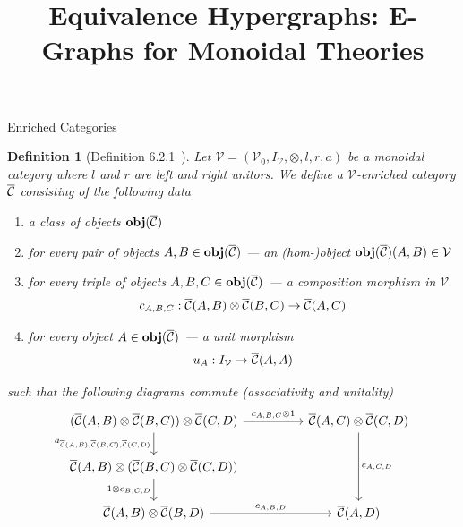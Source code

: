\documentclass[acmsmall, screen, nonacm]{acmart}
\newtheorem{definition}[theorem]{Definition}
\begin{document}
\title{Equivalence Hypergraphs: E-Graphs for Monoidal Theories}

\maketitle



\begin{section}{Enriched Categories}

\begin{definition}[Definition 6.2.1~\cite{Borceux_1994}]
  Let $\mathcal{V} = (\mathcal{V}_{0}, I_{\mathcal{V}}, \otimes, l, r, a)$ be a monoidal category where $l$ and $r$ are left and right unitors.
  We define a $\mathcal{V}$-enriched category ${\overline{\mathcal{C}}}$ consisting of the following data
  \begin{enumerate}
    \item a class of objects ${\mathbf{obj}({\overline{\mathcal{C}}})}$
    \item for every pair of objects $A,B \in {\mathbf{obj}({\overline{\mathcal{C}}})}$ --- an (hom-)object ${\mathbf{obj}({\overline{\mathcal{C}}})}(A,B) \in \mathcal{V}$
    \item for every triple of objects $A,B,C \in {\mathbf{obj}({\overline{\mathcal{C}}})}$ --- a composition morphism in $\mathcal{V}$
    \[
    c_{A,B,C} : {\overline{\mathcal{C}}}(A,B) \otimes {\overline{\mathcal{C}}}(B,C) \to {\overline{\mathcal{C}}}(A,C)
    \]
    \item for every object $A \in {\mathbf{obj}({\overline{\mathcal{C}}})}$ --- a unit morphism
    \[
      u_{A} : I_{\mathcal{V}} \to {\overline{\mathcal{C}}}(A,A)
    \]
  \end{enumerate}
  such that the following diagrams commute (associativity and unitality)
  \[
  \begin{tikzcd}
    {(\enriched{C}(A,B) \otimes \enriched{C}(B,C)) \otimes \enriched{C}(C,D)} \arrow[rr, "{c_{A,B,C} \otimes 1}"] \arrow[d, "{a_{\enriched{C}(A,B),\enriched{C}(B,C),\enriched{C}(C,D)}}"']   &  & {\enriched{C}(A,C) \otimes \enriched{C}(C,D)} \arrow[dd, "{c_{A,C,D}}"]                                                                                     \\
    {\enriched{C}(A,B) \otimes (\enriched{C}(B,C) \otimes \enriched{C}(C,D))} \arrow[d, "{1\otimes c_{B,C,D}}"']                                             &  &                                                                                                                                       \\
    {\enriched{C}(A,B) \otimes \enriched{C}(B,D)} \arrow[rr, "{c_{A,B,D}}"]                                                                       &  & {\enriched{C}(A,D)}                                                                                                                             
  \end{tikzcd}
  \]


\end{definition}
\end{section}
\end{document}
